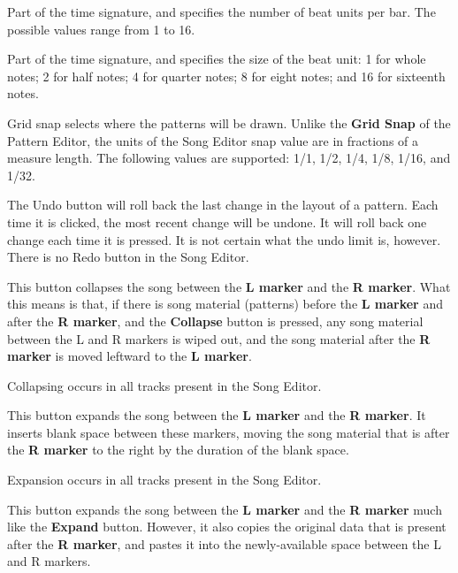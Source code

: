    Part of the time signature, and specifies the number of beat units per bar.
   The possible values range from 1 to 16.

   Part of the time signature, and specifies the size of the beat unit:
   1 for whole notes; 2 for half notes; 4 for quarter notes; 8 for eight notes;
   and 16 for sixteenth notes.

   Grid snap selects where the patterns will be drawn.
   Unlike the \textbf{Grid Snap} of the Pattern Editor, the units
   of the Song Editor snap value are in fractions of a measure length.
   The following values are supported:
   1/1, 1/2, 1/4, 1/8, 1/16, and 1/32.

   The Undo button will roll back the last change in the layout of a
   pattern.  Each time it is clicked, the most recent change will be undone.
   It will roll back one change each time it is pressed.
   It is not certain what the undo limit is, however.
   There is no Redo button in the Song Editor.

   This button collapses the song between the \textbf{L marker} and the
   \textbf{R marker}.
   What this means is that, if there is song material (patterns) before the
   \textbf{L marker} and after the \textbf{R marker},
   and the \textbf{Collapse} button is
   pressed, any song material between the L and R markers is wiped out, and
   the song material after the \textbf{R marker} is moved leftward to
   the \textbf{L marker}.

   Collapsing occurs in all tracks present in the Song Editor.

   This button expands the song between the
   \textbf{L marker} and the \textbf{R marker}.
   It inserts blank space between these markers, moving the song material
   that is after the \textbf{R marker}
   to the right by the duration of the blank space.

   Expansion occurs in all tracks present in the Song Editor.

   This button expands the song between the \textbf{L marker} and the
   \textbf{R marker} much like the \textbf{Expand} button.
   However, it also copies the original data that is present after the
   \textbf{R marker}, and pastes it into the newly-available space between
   the L and R markers.


